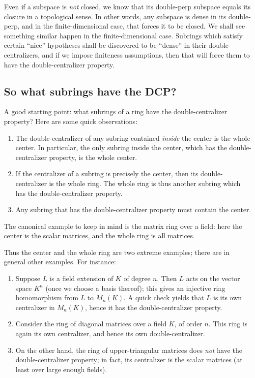 \documentclass[a4paper]{amsart}
\begin{document}
Even if a subspace is {\em not} closed, we know that its double-perp
subspace equals its closure in a topological sense. In other words,
any subspace is dense in its double-perp, and in the
finite-dimensional case, that forces it to be closed. We shall see
something similar happen in the finite-dimensional case. Subrings
which satisfy certain ``nice'' hypotheses shall be discovered to be
``dense'' in their double-centralizers, and if we impose finiteness
assumptions, then that will force them to have the double-centralizer
property.

\subsection{So what subrings have the DCP?}

A good starting point: what subrings of a ring have the
double-centralizer property? Here are some quick observations:

\begin{enumerate}

\item The double-centralizer of any subring contained {\em inside} the
  center is the whole center. In particular, the only subring inside
  the center, which has the double-centralizer property, is the whole center.

\item If the centralizer of a subring is precisely the center, then
  its double-centralizer is the whole ring. The whole ring is thus
  another subring which has the double-centralizer property.

\item Any subring that has the double-centralizer property must
  contain the center.
\end{enumerate}

The canonical example to keep in mind is the matrix ring over a field:
here the center is the scalar matrices, and the whole ring is all
matrices.

Thus the center and the whole ring are two extreme examples; there are
in general other examples. For instance:

\begin{enumerate}

\item Suppose $L$ is a field extension of $K$ of degree $n$. Then $L$
  acts on the vector space $K^n$ (once we choose a basis thereof);
  this gives an injective ring homomorphism from $L$ to $M_n(K)$. A
  quick check yields that $L$ is its own centralizer in $M_n(K)$,
  hence it has the double-centralizer property.

\item Consider the ring of diagonal matrices over a field $K$, of
  order $n$. This ring is again its own centralizer, and hence its own
  double-centralizer.

\item On the other hand, the ring of upper-triangular matrices does
  {\em not} have the double-centralizer property; in fact, its
  centralizer is the scalar matrices (at least over large enough fields).

\end{enumerate}
\end{document}
